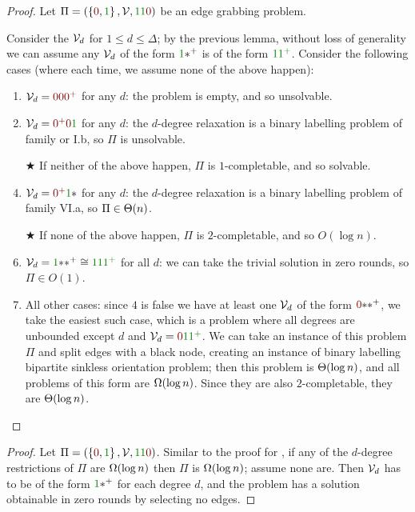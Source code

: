 \documentclass[12pt,a4paper]{article}
\begin{document}
\begin{proof}
    Let $\Pi=(\Set{\n,\y},\Vc,\y\y\n)$ be an edge grabbing problem.
    
    Consider the $\mathcal{V}_d$ for $1\leq d \leq \Delta$; by the previous lemma, without loss of generality we can assume any $\mathcal{V}_d$ of the form $\y\xpl$ is of the form $\y\ypl$. Consider the following cases (where each time, we assume none of the above happen):
    \begin{enumerate}
        \item $\Vc_d=\n\n\npl$ for any $d$: the problem is empty, and so unsolvable.
        \item $\Vc_d=\npl\n\y$ for any $d$: the $d$-degree relaxation is a binary labelling problem of family or \textsf{I.b}, so $\Pi$ is unsolvable.
        \item[$\bigstar$] If neither of the above happen, $\Pi$ is $1$-completable, and so solvable.
        \item $\Vc_d=\npl\y\x$ for any $d$: the $d$-degree relaxation is a binary labelling problem of family \textsf{VI.a}, so $\Pi\in\Theta(n)$.
        \item[$\bigstar$] If none of the above happen, $\Pi$ is $2$-completable, and so $O(\log n)$.
        \item $\Vc_d=\y\x\xpl\cong \y\y\ypl$ for all $d$: we can take the trivial solution  in zero rounds, so $\Pi\in O(1)$.
        \item All other cases: since $4$ is false we have at least one $\mathcal{V}_d$ of the form $\n\x\xpl$, we take the easiest such case, which is a problem where all degrees are unbounded except $d$ and $\Vc_d=\n\y\ypl$. We can take an instance of this problem $\Pi$ and split edges with a black node, creating an instance of binary labelling bipartite sinkless orientation problem; then this problem is $\Theta(\log n)$, and all problems of this form are $\Omega(\log n)$. Since they are also $2$-completable, they are $\Theta(\log n)$.
    \end{enumerate}
\end{proof}
\begin{proof}
    Let $\Pi=(\Set{\n,\y},\Vc,\y\y\n)$. Similar to the proof for , if any of the $d$-degree restrictions of $\Pi$ are $\Omega(\log n)$ then $\Pi$ is $\Omega(\log n)$; assume none are. Then $\mathcal{V}_d$ has to be of the form $\y\xpl$ for each degree $d$, and the problem has a solution obtainable in zero rounds by selecting no edges.
\end{proof}
\end{document}
